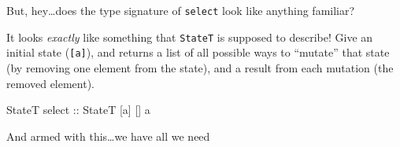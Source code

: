 \documentclass[]{article}
\newenvironment{Shaded}{}{}
\newcommand{\DataTypeTok}[1]{\textcolor[rgb]{0.56,0.13,0.00}{#1}}
\newcommand{\NormalTok}[1]{#1}
\newcommand{\OtherTok}[1]{\textcolor[rgb]{0.00,0.44,0.13}{#1}}
\begin{document}
But, hey\ldots does the type signature of \texttt{select} look like anything
familiar?

It looks \emph{exactly} like something that \texttt{StateT} is supposed to
describe! Give an initial state (\texttt{{[}a{]}}), and returns a list of all
possible ways to ``mutate'' that state (by removing one element from the state),
and a result from each mutation (the removed element).

\begin{Shaded}
\begin{Highlighting}[]
\DataTypeTok{StateT}\OtherTok{ select ::} \DataTypeTok{StateT}\NormalTok{ [a] [] a}
\end{Highlighting}
\end{Shaded}

And armed with this\ldots we have all we need
\end{document}
